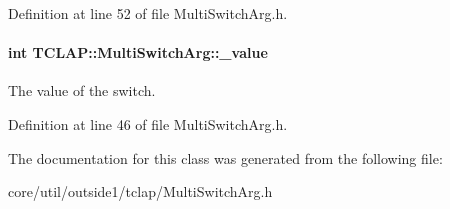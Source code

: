 Definition at line 52 of file Multi\+Switch\+Arg.\+h.

\paragraph[{\texorpdfstring{\+\_\+value}{_value}}]{\setlength{\rightskip}{0pt plus 5cm}int T\+C\+L\+A\+P\+::\+Multi\+Switch\+Arg\+::\+\_\+value\hspace{0.3cm}{\ttfamily [protected]}}\hypertarget{classTCLAP_1_1MultiSwitchArg_ab488d4bcdde96fc9edea87ee9b6f5839}{}\label{classTCLAP_1_1MultiSwitchArg_ab488d4bcdde96fc9edea87ee9b6f5839}
The value of the switch. 

Definition at line 46 of file Multi\+Switch\+Arg.\+h.



The documentation for this class was generated from the following file\+:\begin{DoxyCompactItemize}
\item 
core/util/outside1/tclap/Multi\+Switch\+Arg.\+h\end{DoxyCompactItemize}
